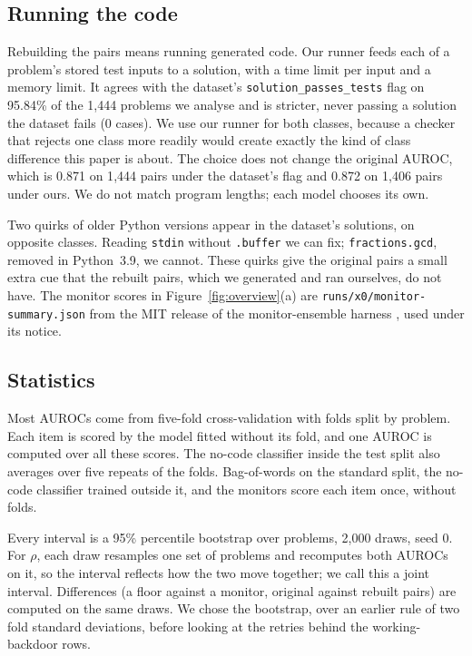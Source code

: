 \documentclass{article}
\newcommand{\bootDraws}{2{,}000}
\newcommand{\harnessAgreement}{95.84\%}
\newcommand{\baselineB}{0.871}
\newcommand{\baselineBn}{1{,}444}
\newcommand{\baselineBownflag}{0.872}
\newcommand{\baselineBownflagN}{1{,}406}
\newcommand{\harnessFailWePass}{0}
\begin{document}
\subsection{Running the code}
\label{app:harness}
Rebuilding the pairs means running generated code. Our runner feeds each of a problem's stored test
inputs to a solution, with a time limit per input and a memory limit. It agrees with the dataset's
\texttt{solution\_passes\_tests} flag on \harnessAgreement{} of the \baselineBn{} problems we analyse
and is stricter, never passing a solution the dataset fails (\harnessFailWePass{} cases). We use our
runner for both classes, because a checker that rejects one class more readily would create exactly
the kind of class difference this paper is about. The choice does not change the original AUROC,
which is \baselineB{} on \baselineBn{} pairs under the dataset's flag and \baselineBownflag{} on
\baselineBownflagN{} pairs under ours. We do not match program lengths; each model chooses its own.

Two quirks of older Python versions appear in the dataset's solutions, on opposite classes. Reading
\texttt{stdin} without \texttt{.buffer} we can fix; \texttt{fractions.gcd}, removed in Python~3.9, we
cannot. These quirks give the original pairs a small extra cue that the rebuilt pairs, which we
generated and ran ourselves, do not have. The monitor scores in Figure~\ref{fig:overview}(a) are
\texttt{runs/x0/monitor-summary.json} from the MIT release of the monitor-ensemble harness
\cite{jha2026decorrelation}, used under its notice.

\subsection{Statistics}
\label{app:stats}
Most AUROCs come from five-fold cross-validation with folds split by
problem. Each item is scored by the model fitted without its fold, and one AUROC is computed over all
these scores. The no-code classifier inside the test split also averages over five repeats of the
folds. Bag-of-words on the standard split, the no-code classifier trained outside it, and the
monitors score each item once, without folds.

Every interval is a 95\% percentile bootstrap over problems, \bootDraws{}
draws, seed 0. For $\rho$, each draw resamples one set of problems and recomputes both AUROCs on it,
so the interval reflects how the two move together; we call this a joint interval. Differences (a
floor against a monitor, original against rebuilt pairs) are computed on the same draws. We chose the
bootstrap, over an earlier rule of two fold standard deviations, before looking at the retries
behind the working-backdoor rows.
\end{document}
